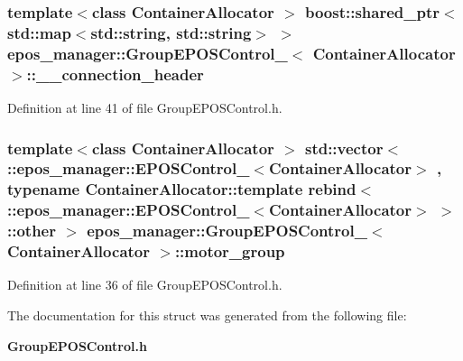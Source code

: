 \subsubsection[{\-\_\-\-\_\-connection\-\_\-header}]{\setlength{\rightskip}{0pt plus 5cm}template$<$class Container\-Allocator $>$ boost\-::shared\-\_\-ptr$<$std\-::map$<$std\-::string, std\-::string$>$ $>$ {\bf epos\-\_\-manager\-::\-Group\-E\-P\-O\-S\-Control\-\_\-}$<$ \-Container\-Allocator $>$\-::{\bf \-\_\-\-\_\-connection\-\_\-header}}\label{structepos__manager_1_1GroupEPOSControl___a6b89801960a0dc7c686147a70fa85057}


\-Definition at line 41 of file \-Group\-E\-P\-O\-S\-Control.\-h.

\subsubsection[{motor\-\_\-group}]{\setlength{\rightskip}{0pt plus 5cm}template$<$class Container\-Allocator $>$ std\-::vector$<$ \-::{\bf epos\-\_\-manager\-::\-E\-P\-O\-S\-Control\-\_\-}$<$\-Container\-Allocator$>$ , typename \-Container\-Allocator\-::template rebind$<$ \-::{\bf epos\-\_\-manager\-::\-E\-P\-O\-S\-Control\-\_\-}$<$\-Container\-Allocator$>$ $>$\-::other $>$ {\bf epos\-\_\-manager\-::\-Group\-E\-P\-O\-S\-Control\-\_\-}$<$ \-Container\-Allocator $>$\-::{\bf motor\-\_\-group}}\label{structepos__manager_1_1GroupEPOSControl___a74c518263e0b20dc6b468408a7c46e26}


\-Definition at line 36 of file \-Group\-E\-P\-O\-S\-Control.\-h.



\-The documentation for this struct was generated from the following file\-:\begin{DoxyCompactItemize}
\item 
{\bf \-Group\-E\-P\-O\-S\-Control.\-h}\end{DoxyCompactItemize}
